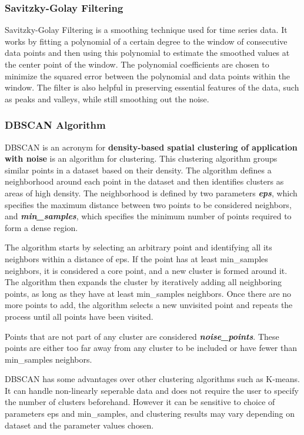 \documentclass{article}
\begin{document}
\subsubsection{Savitzky-Golay Filtering}
Savitzky-Golay Filtering is a smoothing technique used for time series data. It works by fitting a polynomial of a certain degree to the window of consecutive data points and then using this polynomial to estimate the smoothed values at the center point of the window. The polynomial coefficients are chosen to minimize the squared error between the polynomial and data points within the window. The filter is also helpful in preserving essential features of the data, such as peaks and valleys, while still smoothing out the noise. 

\subsubsection{DBSCAN Algorithm}
DBSCAN is an acronym for \textbf{density-based spatial clustering of application with noise} is an algorithm for clustering. This clustering algorithm groups similar points in a dataset based on their density.  
The algorithm defines a neighborhood around each point in the dataset and then identifies clusters as areas of high density. The neighborhood is defined by two parameters \textbf{\textit{eps}}, which specifies the maximum distance between two points to be considered neighbors, and \textbf{\textit{min\_samples}}, which specifies the minimum number of points required to form a dense region. 

\vspace{1em}
The algorithm starts by selecting an arbitrary point and identifying all its neighbors within a distance of eps. If the point has at least min\_samples neighbors, it is considered a core point, and a new cluster is formed around it. The algorithm then expands the cluster by iteratively adding all neighboring points, as long as they have at least min\_samples neighbors. Once there are no more points to add, the algorithm selects a new unvisited point and repeats the process until all points have been visited.

\vspace{1em} 
Points that are not part of any cluster are considered \textbf{\textit{noise\_points}}. These points are either too far away from any cluster to be included or have fewer than min\_samples neighbors.

\vspace{1em}
DBSCAN has some advantages over other clustering algorithms such as K-means. It can handle non-linearly seperable data and does not require the user to specify the number of clusters beforehand. However it can be sensitive to choice of parameters eps and min\_samples, and clustering results may vary depending on dataset and the parameter values chosen.
\end{document}

